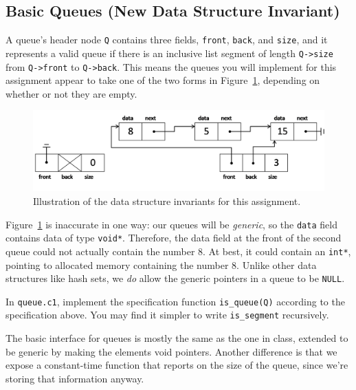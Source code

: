 \documentclass[12pt]{exam}
\begin{document}
\subsection{Basic Queues (New Data Structure Invariant)}

A queue's header node \lstinline'Q' contains three fields,
\lstinline'front', \lstinline'back', and \lstinline'size', and it
represents a valid queue if there is an inclusive list segment of
length \lstinline'Q->size' from \lstinline'Q->front' to
\lstinline'Q->back'. This means the queues you will implement for this
assignment appear to take one of the two forms in
Figure~\ref{fig:datastruct}, depending on whether or not they are
empty.

\clearpage
\begin{figure}
\begin{center}
\includegraphics[width=0.9\linewidth]{img/queue.png}
\end{center}
\caption{Illustration of the data structure invariants for this assignment.}
\label{fig:datastruct}
\end{figure}


Figure~\ref{fig:datastruct} is inaccurate in one way: our queues will
be \emph{generic}, so the \lstinline'data' field contains data of type
\lstinline'void*'. Therefore, the data field at the front of the
second queue could not actually contain the number 8. At best, it
could contain an \lstinline'int*', pointing to allocated memory
containing the number 8. Unlike other data structures like hash sets,
we \emph{do} allow the generic pointers in a queue to be
\lstinline'NULL'.

\begin{task}[2]
  In \lstinline'queue.c1', implement the specification function
  \lstinline'is_queue(Q)' according to the specification above.  You
  may find it simpler to write \lstinline'is_segment' recursively.
\end{task}

The basic interface for queues is mostly the same as the one in class,
extended to be generic by making the elements void pointers. Another
difference is that we expose a constant-time function that reports on
the size of the queue, since we're storing that information anyway.
\end{document}
